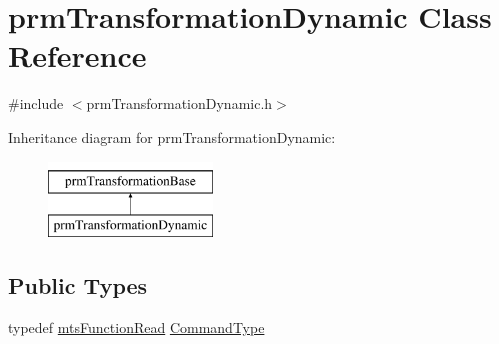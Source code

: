 \hypertarget{classprm_transformation_dynamic}{\section{prm\-Transformation\-Dynamic Class Reference}
\label{classprm_transformation_dynamic}
}


{\ttfamily \#include $<$prm\-Transformation\-Dynamic.\-h$>$}

Inheritance diagram for prm\-Transformation\-Dynamic\-:\begin{figure}[H]
\begin{center}
\leavevmode
\includegraphics[height=2.000000cm]{df/d64/classprm_transformation_dynamic}
\end{center}
\end{figure}
\subsection*{Public Types}
\begin{DoxyCompactItemize}
\item 
typedef \hyperlink{classmts_function_read}{mts\-Function\-Read} \hyperlink{classprm_transformation_dynamic_a08d4a3817f09c309060cbd5a70c6cfb9}{Command\-Type}
\end{DoxyCompactItemize}

